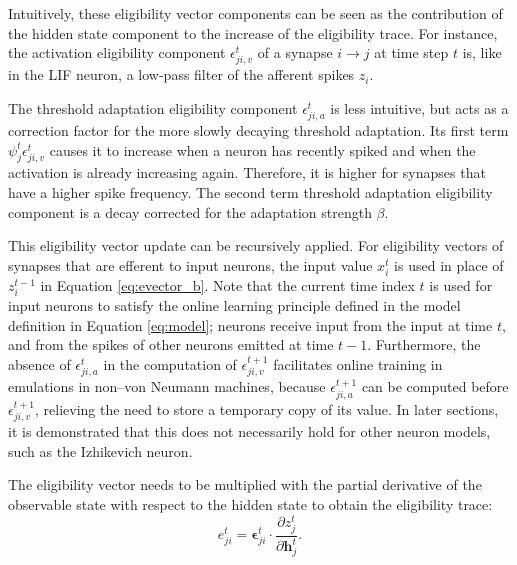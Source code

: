             Intuitively, these eligibility vector components can be seen as the contribution of the hidden state component to the increase of the eligibility trace.
            For instance, the activation eligibility component $\epsilon^t_{ji,v}$ of a synapse $i\rightarrow j$ at time step $t$ is, like in the LIF neuron, a low-pass filter of the afferent spikes $z_i$.

            The threshold adaptation eligibility component $\epsilon^t_{ji,a}$ is less intuitive, but acts as a correction factor for the more slowly decaying threshold adaptation.
            Its first term $\psi^t_j\epsilon^t_{ji,v}$ causes it to increase when a neuron has recently spiked and when the activation is already increasing again.
            Therefore, it is higher for synapses that have a higher spike frequency.
            The second term threshold adaptation eligibility component is a decay corrected for the adaptation strength $\beta$.

            This eligibility vector update can be recursively applied.
            For eligibility vectors of synapses that are efferent to input neurons, the input value $x^t_i$ is used in place of $z_i^{t-1}$ in Equation \ref{eq:evector_b}.
            Note that the current time index $t$ is used for input neurons to satisfy the online learning principle defined in the model definition in Equation \ref{eq:model}; neurons receive input from the input at time $t$, and from the spikes of other neurons emitted at time $t-1$.
            Furthermore, the absence of $\epsilon_{ji, a}^t$ in the computation of $\epsilon_{ji, v}^{t+1}$ facilitates online training in emulations in non--von Neumann machines, because $\epsilon_{ji, a}^{t+1}$ can be computed before $\epsilon_{ji, v}^{t+1}$, relieving the need to store a temporary copy of its value.
            In later sections, it is demonstrated that this does not necessarily hold for other neuron models, such as the Izhikevich neuron.

            The eligibility vector needs to be multiplied with the partial derivative of the observable state with respect to the hidden state to obtain the eligibility trace:
            \begin{equation}
            e^t_{ji} = \bm{\epsilon}_{ji}^t \cdot \frac{\partial z^t_j}{\partial\mathbf{h}^t_j}.
            \end{equation}

